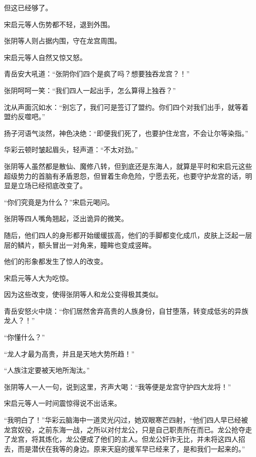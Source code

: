 \begin{this_body}
但这已经够了。

宋启元等人伤势都不轻，退到外围。

张阴等人则占据内围，守在龙宫周围。

宋启元等人自然又惊又怒。

青岳安大吼道：“张阴你们四个是疯了吗？想要独吞龙宫？！”

张阴呵呵一笑：“我们四人一起出手，怎么算得上独吞？”

沈从声面沉如水：“别忘了，我们可是签订了盟约。你们四个对我们出手，就等着盟约反噬吧。”

扬子河语气淡然，神色决绝：“即便我们死了，也要护住龙宫，不会让尔等染指。”

华彩云顿时皱起眉头，轻声道：“不太对劲。”

张阴等人虽然都是散仙、魔修八转，但到底还是东海人，就算是平时和宋启元这些超级势力的首脑有矛盾恩怨，但冒着生命危险，宁愿去死，也要守护龙宫的话，明显是立场已经彻底改变了。

“你们究竟是为什么？”宋启元喝问。

张阴等四人嘴角翘起，泛出诡异的微笑。

随后，他们四人的身形都开始缓缓拔高，他们的手脚都变化成爪，皮肤上泛起一层层的鳞片，额头冒出一对角来，瞳眸也变成竖眸。

他们的形象都发生了惊人的改变。

宋启元等人大为吃惊。

因为这些改变，使得张阴等人和龙公变得极其类似。

青岳安怒火中烧：“你们居然舍弃高贵的人族身份，自甘堕落，转变成低劣的异族龙人？！”

“你懂什么？”

“龙人才最为高贵，并且是天地大势所趋！”

“人族注定要被天地所淘汰。”

张阴等人一人一句，说到这里，齐声大喝：“我等便是龙宫守护四大龙将！”

宋启元等人一时间震惊得说不出话来。

“我明白了！”华彩云脑海中一道灵光闪过，她双眼寒芒四射，“他们四人早已经被龙宫奴役，之前东海一战，之所以对付龙公，只是自己职责所在而已。龙公抢夺走了龙宫，将其炼化，龙公便成了他们的主人。但龙公奸诈无比，并未将这四人招去，而是潜伏在我等的身边。原来天庭的援军早已经来了，是和我们一起来的。”

\end{this_body}

